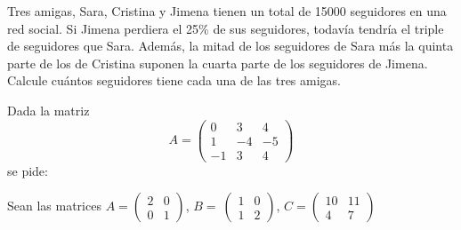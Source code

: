 \documentclass[addpoints,spanish, 12pt,a4paper]{exam}
\begin{document}
\begin{questions}

%
%
%


\question[2]
Tres amigas, Sara, Cristina y Jimena tienen un total de 15000 seguidores en una red social. 
Si Jimena perdiera el 25\% de sus seguidores, todavía tendría el triple de seguidores que Sara. 
Además, la mitad de los seguidores de Sara más la quinta parte de los de Cristina suponen la cuarta parte de los seguidores de Jimena. 
Calcule cuántos seguidores tiene cada una de las tres amigas.

\question Dada la matriz 
\[
A = \begin{pmatrix} 0 & 3 & 4 \\ 1 & -4 & -5 \\ -1 & 3 & 4 \end{pmatrix}
\]
se pide:



\question 
Sean las matrices $A=\left(\begin{matrix}2 & 0\\0 & 1\end{matrix}\right)$, $B= \  \left(\begin{matrix}1 & 0\\1 & 2\end{matrix}\right)$, $C=\left(\begin{matrix}10 & 11\\4 & 7\end{matrix}\right)$
\begin{parts}

\end{parts}
\end{questions}
\end{document}
